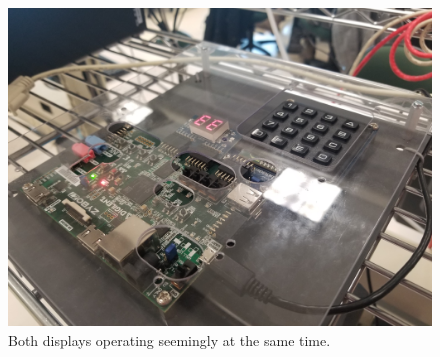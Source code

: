 \documentclass{article}
\begin{document}
\begin{appendices}
    
    \begin{figure}[H]
	\centering
        \includegraphics[width=125mm]{counter_dual.jpg}
        \caption{Both displays operating seemingly at the same time.}
        \label{fig:counter_dual}
    \end{figure}
\end{appendices}
\end{document}
